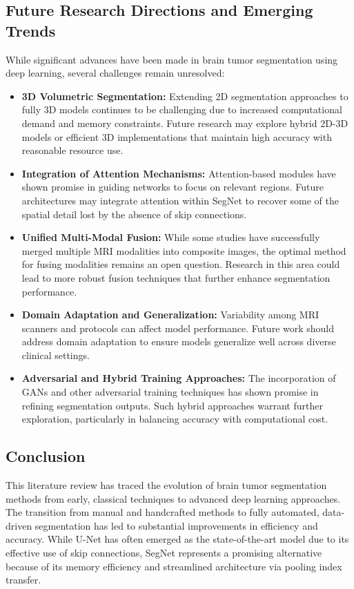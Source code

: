 \subsection{Future Research Directions and Emerging Trends}
\label{sec:future_trends}
While significant advances have been made in brain tumor segmentation using deep learning, several challenges remain unresolved:
\begin{itemize}
    \item \textbf{3D Volumetric Segmentation:} Extending 2D segmentation approaches to fully 3D models continues to be challenging due to increased computational demand and memory constraints. Future research may explore hybrid 2D-3D models or efficient 3D implementations that maintain high accuracy with reasonable resource use.
    
    \item \textbf{Integration of Attention Mechanisms:} Attention-based modules have shown promise in guiding networks to focus on relevant regions. Future architectures may integrate attention within SegNet to recover some of the spatial detail lost by the absence of skip connections.
    
    \item \textbf{Unified Multi-Modal Fusion:} While some studies have successfully merged multiple MRI modalities into composite images, the optimal method for fusing modalities remains an open question. Research in this area could lead to more robust fusion techniques that further enhance segmentation performance.
    
    \item \textbf{Domain Adaptation and Generalization:} Variability among MRI scanners and protocols can affect model performance. Future work should address domain adaptation to ensure models generalize well across diverse clinical settings.
    
    \item \textbf{Adversarial and Hybrid Training Approaches:} The incorporation of GANs and other adversarial training techniques has shown promise in refining segmentation outputs. Such hybrid approaches warrant further exploration, particularly in balancing accuracy with computational cost.
\end{itemize}

\subsection{Conclusion}
\label{sec:lit_conclusion}
This literature review has traced the evolution of brain tumor segmentation methods from early, classical techniques to advanced deep learning approaches. The transition from manual and handcrafted methods to fully automated, data-driven segmentation has led to substantial improvements in efficiency and accuracy. While U-Net has often emerged as the state-of-the-art model due to its effective use of skip connections, SegNet represents a promising alternative because of its memory efficiency and streamlined architecture via pooling index transfer.

